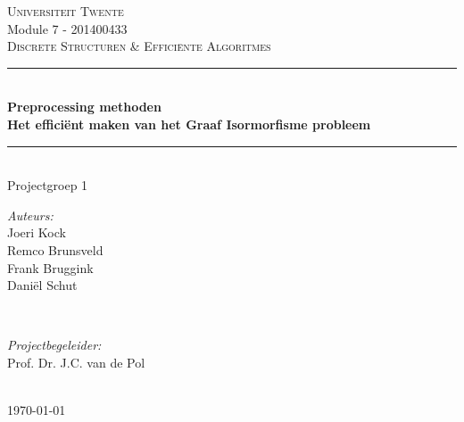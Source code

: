 
\begin{titlepage}
\newcommand{\HRule}{\rule{\linewidth}{0.5mm}}
\center 		%
 

\textsc{\large Universiteit Twente}\\[1.5cm]
Module 7 - 201400433\\
\vspace{5mm}
\textsc{\Large Discrete Structuren \& Effici\"ente Algoritmes}\\[0.5cm]
\vspace{15mm}


\HRule \\[0.4cm]
{ \huge \bfseries Preprocessing methoden}\\[0.4cm]
{ \large \bfseries Het effici\"ent maken van het Graaf Isormorfisme probleem}\\[0.4cm]
\HRule \\[1.5cm]
 

Projectgroep 1\\
\vspace{10mm}
\begin{minipage}{0.4\textwidth}
\begin{flushleft} \large
\emph{Auteurs:}\\
Joeri Kock\\
Remco Brunsveld\\
Frank Bruggink\\
Dani\"el Schut
\end{flushleft}
\end{minipage}
~
\begin{minipage}{0.4\textwidth}
\begin{flushright} \large
\emph{Projectbegeleider:} \\
Prof. Dr. J.C. van de Pol
\end{flushright}
\end{minipage}\\[4cm]


{\large \today}\\[3cm]

\pagebreak 			%

\end{titlepage}